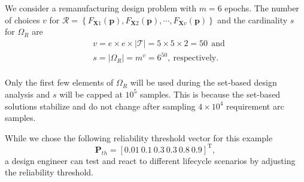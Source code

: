 We consider a remanufacturing design problem with $m = 6$ epochs. The number of choices $v$ for $\mathcal{R} = \left\{F_{\mathbf{X}1}(\mathbf{p}),F_{\mathbf{X}2}(\mathbf{p}),\cdots,F_{\mathbf{X}v}(\mathbf{p})\right\}$ and the cardinality $s$ for $\Omega_R$ are
%
\begin{equation*}
	\begin{aligned}
		& v = e \times e \times |\mathcal{T}| = 5 \times 5 \times 2 = 50~~\textrm{and}\\
		& s = |\Omega_R| = m^v = 6^{50},~\mathrm{respectively}.\\
	\end{aligned}
\end{equation*}

Only the first few elements of $\Omega_R$ will be used during the set-based design analysis and $s$ will be capped at $10^5$ samples. This is because the set-based solutions stabilize and do not change after sampling $4 \times 10^4$ requirement arc samples.

While we chose the following reliability threshold vector for this example
%
\begin{equation*}
    \mathbf{P}_{th} = \left[0.01 ~ 0.1 ~ 0.3 ~ 0.3 ~ 0.8 ~ 0.9\right]^{\mathrm{T}},
\end{equation*}
%
a design engineer can test and react to different lifecycle scenarios by adjusting the reliability threshold.

